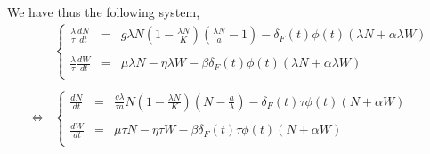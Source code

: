 \documentclass{article}
\begin{document}
\paragraph{}
We have thus the following system,
\[
\begin{array}{rl}
& 

\left\lbrace
\begin{array}{rcl}
\frac{\lambda}{\tau}\frac{dN}{dt} & = & g\lambda N(1-\frac{\lambda N}{K})(\frac{\lambda N}{a}-1) - \delta_F(t)\phi(t)(\lambda N+\alpha \lambda W) \\
\\
\frac{\lambda}{\tau}\frac{dW}{dt} & = & \mu \lambda N -\eta \lambda W - \beta\delta_F(t)\phi(t)(\lambda N+\alpha \lambda W) \\
\end{array}
\right.
\\
\\
\Leftrightarrow & 
\left\lbrace
\begin{array}{rcl}
\frac{dN}{dt} & = & \frac{g \lambda}{\tau a} N(1-\frac{\lambda N}{K})(N-\frac{a}{\lambda}) - \delta_F(t)\tau\phi(t)(N+\alpha W) \\
\\
\frac{dW}{dt} & = & \mu \tau N -\eta \tau W - \beta\delta_F(t)\tau\phi(t)(N+\alpha W) \\
\end{array}
\right.
\end{array}
\]
\end{document}
